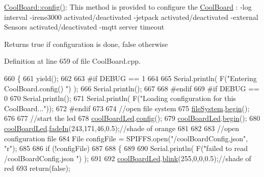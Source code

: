 \hyperlink{class_cool_board_a583a874c09c07e70a6eb9229fc4beddb}{Cool\+Board\+::config()}\+: This method is provided to configure the \hyperlink{class_cool_board}{Cool\+Board} \+: -\/log interval -\/irene3000 activated/deactivated -\/jetpack activated/deactivated -\/external Sensors activated/deactivated -\/mqtt server timeout

\begin{DoxyReturn}{Returns}
true if configuration is done, false otherwise 
\end{DoxyReturn}


Definition at line 659 of file Cool\+Board.\+cpp.


\begin{DoxyCode}
660 \{
661     yield();
662 
663 \textcolor{preprocessor}{#if DEBUG == 1}
664 
665     Serial.println( F(\textcolor{stringliteral}{"Entering CoolBoard.config() "}) );
666     Serial.println();
667 
668 \textcolor{preprocessor}{#endif}
669 \textcolor{preprocessor}{#if DEBUG == 0}
670     Serial.println();
671     Serial.println( F(\textcolor{stringliteral}{"Loading configuration for this CoolBoard..."}));
672 \textcolor{preprocessor}{#endif }
673 
674     \textcolor{comment}{//open file system}
675     \hyperlink{class_cool_board_a42c2586fbb13ff7f06538e9284e8538d}{fileSystem}.\hyperlink{class_cool_file_system_a6ba6f666ed4c530174f8569d2c636748}{begin}();
676     
677     \textcolor{comment}{//start the led}
678     \hyperlink{class_cool_board_a1b1d3c684a5baa56b08486e192fd8e97}{coolBoardLed}.\hyperlink{class_cool_board_led_a1b60e5e30bea96c49ed62ed1bf1ffc8b}{config}();
679     \hyperlink{class_cool_board_a1b1d3c684a5baa56b08486e192fd8e97}{coolBoardLed}.\hyperlink{class_cool_board_led_ae3cbde8affcc6f011cbd698c8ef911f6}{begin}();
680     \hyperlink{class_cool_board_a1b1d3c684a5baa56b08486e192fd8e97}{coolBoardLed}.\hyperlink{class_cool_board_led_ab778f5e7bed0ab74e3906d82110493c3}{fadeIn}(243,171,46,0.5);\textcolor{comment}{//shade of orange     }
681 
682     
683     \textcolor{comment}{//open configuration file}
684     File configFile = SPIFFS.open(\textcolor{stringliteral}{"/coolBoardConfig.json"}, \textcolor{stringliteral}{"r"});
685     
686     \textcolor{keywordflow}{if} (!configFile)
687 
688     \{
689     
690         Serial.println( F(\textcolor{stringliteral}{"failed to read /coolBoardConfig.json  "}) );
691 
692         \hyperlink{class_cool_board_a1b1d3c684a5baa56b08486e192fd8e97}{coolBoardLed}.\hyperlink{class_cool_board_led_a96e1ea13003eee34c9dbcef340404426}{blink}(255,0,0,0.5);\textcolor{comment}{//shade of red     }
693         \textcolor{keywordflow}{return}(\textcolor{keyword}{false});

\end{DoxyCode}
